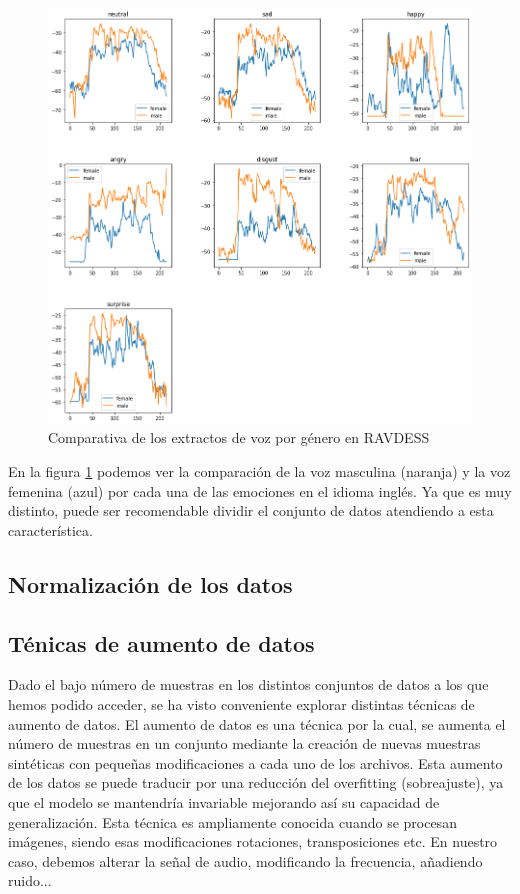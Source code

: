 \documentclass[11pt,a4paper,spanish]{book}
\begin{document}
	\begin{figure}[H]
		\centering
		\includegraphics[scale=0.35]{comparative_waveform.png} 
		\caption{Comparativa de los extractos de voz por género en RAVDESS}
		\label{fig:comp_emociones_genero}
	\end{figure}
	En la figura \ref{fig:comp_emociones_genero} podemos ver la comparación de la voz masculina (naranja) y la voz femenina (azul) por cada una de las emociones en el idioma inglés. Ya que es muy distinto, puede ser recomendable dividir el conjunto de datos atendiendo a esta característica.
	
	
	
	\subsection{Normalización de los datos}
	
	
	\subsection{Ténicas de aumento de datos}
	Dado el bajo número de muestras en los distintos conjuntos de datos a los que hemos podido acceder, se ha visto conveniente explorar distintas técnicas de aumento de datos. El aumento de datos es una técnica por la cual, se aumenta el número de muestras en un conjunto mediante la creación de nuevas muestras sintéticas con pequeñas modificaciones a cada uno de los archivos. Esta aumento de los datos se puede traducir por una reducción del overfitting (sobreajuste), ya que el modelo se mantendría invariable mejorando así su capacidad de generalización.
	Esta técnica es ampliamente conocida cuando se procesan imágenes, siendo esas modificaciones rotaciones, transposiciones etc. En nuestro caso, debemos alterar la señal de audio, modificando la frecuencia, añadiendo ruido...
	
\end{document}
